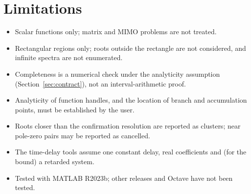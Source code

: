 \section{Limitations}

\begin{itemize}
  \item Scalar functions only; matrix and MIMO problems are not treated.
  \item Rectangular regions only; roots outside the rectangle are not
        considered, and infinite spectra are not enumerated.
  \item Completeness is a numerical check under the analyticity assumption
        (Section~\ref{sec:contract}), not an interval-arithmetic proof.
  \item Analyticity of function handles, and the location of branch and
        accumulation points, must be established by the user.
  \item Roots closer than the confirmation resolution are reported as
        clusters; near pole-zero pairs may be reported as cancelled.
  \item The time-delay tools assume one constant delay, real coefficients
        and (for the bound) a retarded system.
  \item Tested with MATLAB R2023b; other releases and Octave have not been
        tested.
\end{itemize}
